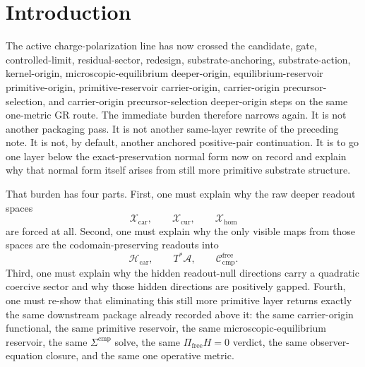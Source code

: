 \documentclass[11pt]{article}
\newcommand{\Sub}{\mathcal A}
\newcommand{\CompFree}{\mathscr C_{\mathrm{cmp}}^{\mathrm{free}}}
\newcommand{\CarrierClass}{\mathscr H_{\mathrm{car}}}
\newcommand{\DeepTensorClass}{\mathscr X_{\mathrm{car}}}
\newcommand{\DeepRelabelClass}{\mathscr X_{\mathrm{cur}}}
\newcommand{\DeepFreeClass}{\mathscr X_{\mathrm{hom}}}
\begin{document}
\begin{abstract}
The scope remains disciplined. This note does not claim a final ultraviolet completion or a uniqueness theorem for every conceivable more primitive substrate sector. Its positive claim is narrower and exact: at the current quadratic exact-preservation scope, the raw deeper readout spaces and their kernel-coercive normal form arise as the unsuppressed projected sector of a still more primitive ambient substrate layer with positively gapped spectators, while preserving the same downstream one-metric completion package.
\end{abstract}

\section{Introduction}

The active charge-polarization line has now crossed the candidate, gate, controlled-limit, residual-sector, redesign, substrate-anchoring, substrate-action, kernel-origin, microscopic-equilibrium deeper-origin, equilibrium-reservoir primitive-origin, primitive-reservoir carrier-origin, carrier-origin precursor-selection, and carrier-origin precursor-selection deeper-origin steps on the same one-metric GR route. The immediate burden therefore narrows again. It is not another packaging pass. It is not another same-layer rewrite of the preceding note. It is not, by default, another anchored positive-pair continuation. It is to go one layer below the exact-preservation normal form now on record and explain why that normal form itself arises from still more primitive substrate structure.

That burden has four parts. First, one must explain why the raw deeper readout spaces
\[
\DeepTensorClass,\qquad
\DeepRelabelClass,\qquad
\DeepFreeClass
\]
are forced at all. Second, one must explain why the only visible maps from those spaces are the codomain-preserving readouts into
\[
\CarrierClass,\qquad
T^*\Sub,\qquad
\CompFree.
\]
Third, one must explain why the hidden readout-null directions carry a quadratic coercive sector and why those hidden directions are positively gapped. Fourth, one must re-show that eliminating this still more primitive layer returns exactly the same downstream package already recorded above it: the same carrier-origin functional, the same primitive reservoir, the same microscopic-equilibrium reservoir, the same \(\Sigma^{\mathrm{cmp}}\) solve, the same \(\Pi_{\mathrm{free}}H=0\) verdict, the same observer-equation closure, and the same one operative metric.
\end{document}

